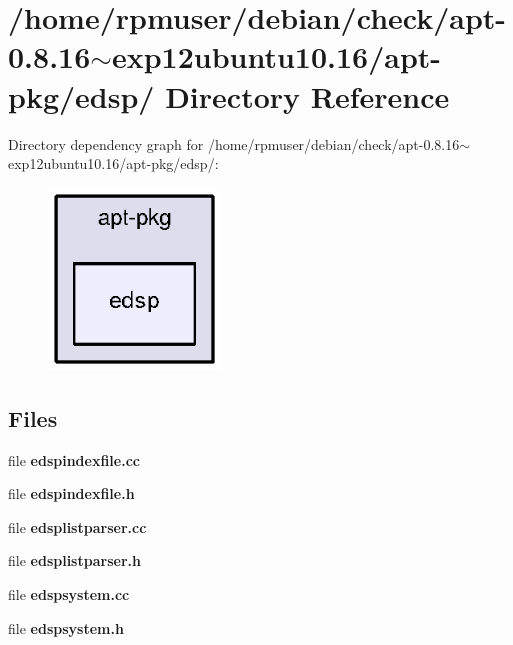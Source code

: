 \section{/home/rpmuser/debian/check/apt-\/0.8.16$\sim$exp12ubuntu10.16/apt-\/pkg/edsp/ \-Directory \-Reference}
\label{dir_77d595836664157d7f95e43ec3790eb5}
\-Directory dependency graph for /home/rpmuser/debian/check/apt-\/0.8.16$\sim$exp12ubuntu10.16/apt-\/pkg/edsp/\-:
\nopagebreak
\begin{figure}[H]
\begin{center}
\leavevmode
\includegraphics[width=130pt]{dir_77d595836664157d7f95e43ec3790eb5_dep}
\end{center}
\end{figure}
\subsection*{\-Files}
\begin{DoxyCompactItemize}
\item 
file {\bfseries edspindexfile.\-cc}
\item 
file {\bfseries edspindexfile.\-h}
\item 
file {\bfseries edsplistparser.\-cc}
\item 
file {\bfseries edsplistparser.\-h}
\item 
file {\bfseries edspsystem.\-cc}
\item 
file {\bfseries edspsystem.\-h}
\end{DoxyCompactItemize}
